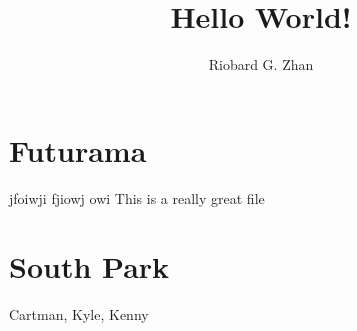 \documentclass{article}
\author{Riobard G. Zhan}
\title{Hello World!}
\begin{document}
\section{Futurama}

jfoiwji fjiowj owi This is a really great file


\section{South Park}

Cartman, Kyle, Kenny
\end{document}
